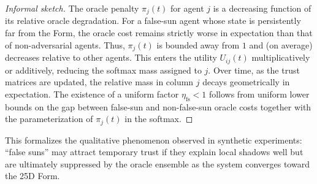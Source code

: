 \documentclass[11pt]{article}
\begin{document}
\begin{proof}[Informal sketch]
The oracle penalty $\pi_j(t)$ for agent $j$ is a decreasing function of
its relative oracle degradation.
For a false-sun agent whose state is persistently far from the Form,
the oracle cost remains strictly worse in expectation than that of
non-adversarial agents.
Thus, $\pi_j(t)$ is bounded away from $1$ and (on average) decreases
relative to other agents.
This enters the utility $U_{ij}(t)$ multiplicatively or additively,
reducing the softmax mass assigned to $j$.
Over time, as the trust matrices are updated, the relative mass in
column $j$ decays geometrically in expectation.
The existence of a uniform factor $\eta_{\mathrm{fs}}<1$ follows from
uniform lower bounds on the gap between false-sun and non-false-sun
oracle costs together with the parameterization of $\pi_j(t)$ in the
softmax.
\end{proof}

This formalizes the qualitative phenomenon observed in synthetic
experiments: ``false suns'' may attract temporary trust if they explain
local shadows well but are ultimately suppressed by the oracle ensemble
as the system converges toward the 25D Form.


\nocite{*}


\end{document}
